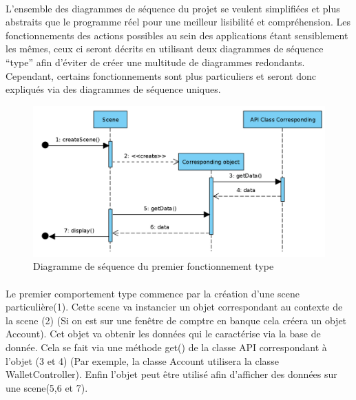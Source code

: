 \documentclass[]{article}
\begin{document}
    \paragraph{}L'ensemble des diagrammes de séquence du projet se veulent simplifiées et plus abstraits que le programme réel pour une meilleur lisibilité et compréhension. Les fonctionnements des actions possibles au sein des applications étant sensiblement les mêmes, ceux ci seront décrits en utilisant deux diagrammes de séquence “type” afin d’éviter de créer une multitude de diagrammes redondants. Cependant, certains fonctionnements sont plus particuliers et seront donc expliqués via des diagrammes de séquence uniques.

    \begin{figure}[ht]
        \centering
        \includegraphics[scale=0.32]{img/type1.png}
        \caption{Diagramme de séquence du premier fonctionnement type}
        \label{fig1}
        \end{figure}

    \paragraph{}Le premier comportement type commence par la création d’une scene particulière(1). Cette scene va instancier un objet correspondant au contexte de la scene (2) (Si on est sur une fenêtre de comptre en banque cela créera un objet Account). Cet objet va obtenir les données qui le caractérise via la base de donnée. Cela se fait via une méthode get() de la classe API correspondant à l’objet (3 et 4) (Par exemple, la classe Account utilisera la classe WalletController). Enfin l’objet peut être utilisé afin d’afficher des données sur une scene(5,6 et 7).

    \newpage
\end{document}
